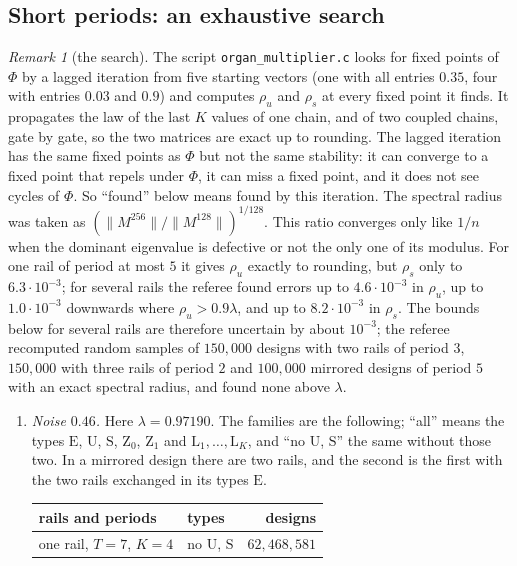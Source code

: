 \documentclass[11pt]{amsart}
\theoremstyle{definition}
\theoremstyle{remark}
\newtheorem{remark}[theorem]{Remark}
\begin{document}
\subsection{Short periods: an exhaustive search}\label{sec:search}

\begin{remark}[the search]\label{rem:designs}
The script \texttt{organ\_multiplier.c} looks for fixed points of $\Phi$ by a lagged iteration from
five starting vectors (one with all entries $0.35$, four with entries $0.03$ and $0.9$) and computes
$\rho_u$ and $\rho_s$ at every fixed point it finds. It propagates the law of the last $K$ values
of one chain, and of two coupled chains, gate by gate, so the two matrices are exact up to
rounding. The lagged iteration has the same fixed points as $\Phi$ but not the same stability: it
can converge to a fixed point that repels under $\Phi$, it can miss a fixed point, and it does not
see cycles of $\Phi$. So ``found'' below means found by this iteration. The spectral radius was
taken as $(\|M^{256}\|/\|M^{128}\|)^{1/128}$. This ratio converges only like $1/n$ when the
dominant eigenvalue is defective or not the only one of its modulus. For one rail of period at
most $5$ it gives $\rho_u$ exactly to rounding, but $\rho_s$ only to $6.3\cdot10^{-3}$; for
several rails the referee found errors up to $4.6\cdot10^{-3}$ in $\rho_u$, up to
$1.0\cdot10^{-3}$ downwards where $\rho_u>0.9\lambda$, and up to $8.2\cdot10^{-3}$ in
$\rho_s$. The bounds below for several rails are therefore uncertain by about $10^{-3}$; the
referee recomputed random samples of $150{,}000$ designs with two rails of period $3$, $150{,}000$
with three rails of period $2$ and $100{,}000$ mirrored designs of period $5$ with an exact
spectral radius, and found none above $\lambda$.
\begin{enumerate}[label=(\roman*),leftmargin=2.4em]
\item \emph{Noise $0.46$.} Here $\lambda=0.97190$. The families are the following; ``all''
means the types $\mathrm E$, $\mathrm U$, $\mathrm S$, $\mathrm Z_0$, $\mathrm Z_1$ and
$\mathrm L_1,\dots,\mathrm L_K$, and ``no $\mathrm U$, $\mathrm S$'' the same without those two.
In a mirrored design there are two rails, and the second is the first with the two rails
exchanged in its types $\mathrm E$.
\begin{center}
\begin{tabular}{llr}
\toprule
rails and periods & types & designs\\
\midrule
one rail, $T=7$, $K=4$ & no $\mathrm U$, $\mathrm S$ & $62{,}468{,}581$\\

\end{tabular}
\end{center}
\end{enumerate}
\end{remark}
\end{document}
